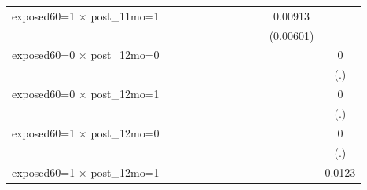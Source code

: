 \begin{table}[htbp]
\begin{tabular}{l*{11}{c}}
\addlinespace
exposed60=1 $\times$ post\_11mo=1&                     &                     &                     &                     &                     &                     &                     &                     &                     &     0.00913         &                     \\
                    &                     &                     &                     &                     &                     &                     &                     &                     &                     &   (0.00601)         &                     \\
\addlinespace
exposed60=0 $\times$ post\_12mo=0&                     &                     &                     &                     &                     &                     &                     &                     &                     &                     &           0         \\
                    &                     &                     &                     &                     &                     &                     &                     &                     &                     &                     &         (.)         \\
\addlinespace
exposed60=0 $\times$ post\_12mo=1&                     &                     &                     &                     &                     &                     &                     &                     &                     &                     &           0         \\
                    &                     &                     &                     &                     &                     &                     &                     &                     &                     &                     &         (.)         \\
\addlinespace
exposed60=1 $\times$ post\_12mo=0&                     &                     &                     &                     &                     &                     &                     &                     &                     &                     &           0         \\
                    &                     &                     &                     &                     &                     &                     &                     &                     &                     &                     &         (.)         \\
\addlinespace
exposed60=1 $\times$ post\_12mo=1&                     &                     &                     &                     &                     &                     &                     &                     &                     &                     &      0.0123         \\

\end{tabular}
\end{table}
